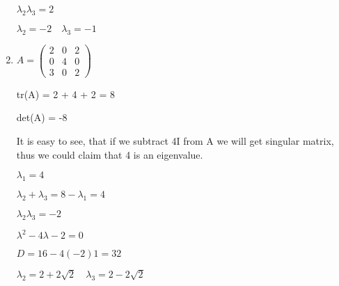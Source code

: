 \documentclass[12pt,letterpaper]{article}
\begin{document}
\begin{enumerate}[label=(\alph*)]
        $\lambda_2\lambda_3 = 2$
        
        $\lambda_2 = -2\quad\lambda_3 = -1$
    \item
        $A = \begin{pmatrix}
            2 & 0 & 2 \\
            0 & 4 & 0 \\
            3 & 0 & 2
        \end{pmatrix}$
        
        tr(A) = 2 + 4 + 2 = 8
        
        det(A) = -8
        
        It is easy to see, that if we subtract 4I from A we will get singular matrix, thus we could claim that 4 is an eigenvalue.
        
        $\lambda_1 = 4$
        
        $\lambda_2 + \lambda_3 = 8 - \lambda_1 = 4$
        
        $\lambda_2\lambda_3 = -2$
        
        $\lambda^2 - 4\lambda - 2 = 0$
        
        $D = 16 - 4 (-2) 1 = 32$
        
        $\lambda_2 = 2 + 2\sqrt{2}\quad\lambda_3 = 2 - 2\sqrt{2}$
\end{enumerate}
\end{document}
